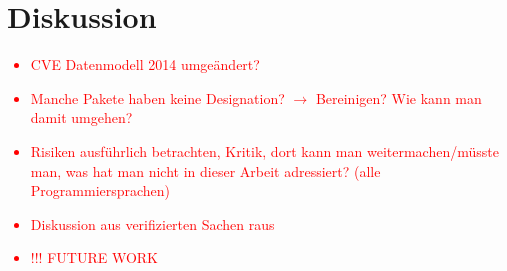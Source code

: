 \section{Diskussion} \label{sec:Diskussion}
    \textcolor{red}{
        \begin{itemize}
            \item CVE Datenmodell 2014 umgeändert?
            \item Manche Pakete haben keine Designation? $\rightarrow$ Bereinigen? Wie kann man damit umgehen?
            \item Risiken ausführlich betrachten, Kritik, dort kann man weitermachen/müsste man, was hat man nicht in dieser Arbeit adressiert? (alle Programmiersprachen)
            \item Diskussion aus verifizierten Sachen raus
            \item !!! FUTURE WORK
        \end{itemize}
    }
